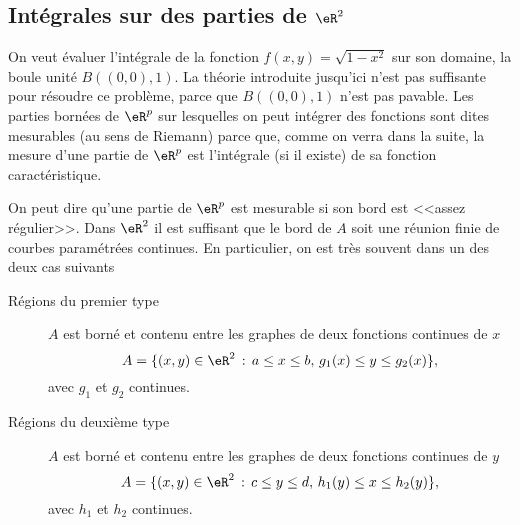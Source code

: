 \subsection{Intégrales sur des parties de \( \eR^2\) }

On veut évaluer l'intégrale de la fonction \( f(x,y)=\sqrt{1-x^2}\) sur son domaine, la boule unité \( B((0,0),1)\). La théorie introduite jusqu'ici n'est pas suffisante pour résoudre  ce problème, parce que \( B((0,0),1)\) n'est pas pavable. Les parties bornées de \( \eR^p\) sur lesquelles on peut intégrer des fonctions sont dites mesurables (au sens de Riemann) parce que, comme on verra dans la suite, la mesure d'une partie de \( \eR^p\) est l'intégrale (si il existe) de sa fonction caractéristique.

On peut dire qu'une partie de \( \eR^p\)  est mesurable si son bord est <<assez régulier>>. Dans \( \eR^2\) il est suffisant que le bord de \( A\) soit une réunion finie de courbes paramétrées continues. En particulier, on est très souvent dans un des deux cas suivants
\begin{description}
	\item[Régions du premier type] \( A\) est borné et contenu entre les graphes de deux fonctions continues de \( x\)
	      \[
		      A=\{(x,y)\in\eR^2 \,:\, a\leq x\leq b, \, g_1(x)\leq y\leq g_2(x)\},
	      \]
	      avec \( g_1\) et \( g_2\) continues.
	\item[Régions du deuxième type] \( A\) est borné et contenu entre les graphes de deux fonctions continues de \( y\)
	      \[
		      A=\{(x,y)\in\eR^2 \,:\, c\leq y\leq d, \, h_1(y)\leq x\leq h_2(y)\},
	      \]
	      avec \( h_1\) et \( h_2\) continues.
\end{description}
\newcommand{\CaptionFigRegioniPrimoeSecondoTipo}{Régions du premier et du deuxième type}


